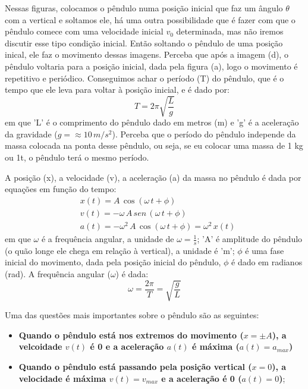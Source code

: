 \documentclass[12pt]{extarticle}
\newcommand{\<}{\langle}
\renewcommand{\>}{\rangle}
\theoremstyle{definition}
\begin{document}
Nessas figuras, colocamos o pêndulo numa posição inicial que faz um ângulo $\theta$ com a vertical e soltamos ele, há uma outra possibilidade que é fazer com que o pêndulo comece com uma velocidade inicial $v_0$ determinada, mas não iremos discutir esse tipo condição inicial. Então soltando o pêndulo de uma posição inical, ele faz o movimento dessas imagens. Perceba que após a imagem (d), o pêndulo voltaria para a posição inicial, dada pela figura (a), logo o movimento é repetitivo e periódico. Conseguimos achar o período (T) do pêndulo, que é o tempo que ele leva para voltar à posição inicial, e é dado por:
\begin{equation}
    T = 2\pi \sqrt{\frac{L}{g}}
\end{equation}
\noindent em que 'L' é o comprimento do pêndulo dado em metros (m) e 'g' é a aceleração da gravidade ($g=\approx 10\,m/s^2$). Perceba que o período do pêndulo independe da massa colocada na ponta desse pêndulo, ou seja, se eu colocar uma massa de 1 kg ou 1t, o pêndulo terá o mesmo período.

A posição (x), a velocidade (v), a aceleração (a) da massa no pêndulo é dada por equações em função do tempo:
\begin{align}
    &x(t) = A\,\cos(\omega\,t + \phi) \label{eq:pos}\\
    &v(t) = -\omega\,A\,sen\,(\omega\, t + \phi)\label{eq:vel}\\\
    &a(t) = -\omega^2\,A\,\cos(\omega\,t + \phi) = \omega^2\,x(t) \label{eq:acel}\
\end{align}
\noindent em que $\omega$ é a frequência angular, a unidade de $\omega = \frac{1}{s}$; 'A' é amplitude do pêndulo (o quão longe ele chega em relação à vertical), a unidade é 'm'; $\phi$ é uma fase inicial do movimento, dada pela posição inicial do pêndulo, $\phi$ é dado em radianos (rad). A frequência angular ($\omega$) é dada:
\begin{equation}
    \omega = \frac{2\pi}{T} = \sqrt{\frac{g}{L}}
\end{equation}

Uma das questões mais importantes sobre o pêndulo são as seguintes:
\begin{itemize}
    \item \textbf{Quando o pêndulo está nos extremos do movimento ($x= \pm A$), a velcoidade $v(t)$ é 0 e a aceleração $a(t)$ é máxima ($a(t) = a_{max}$)}
    \item \textbf{Quando o pêndulo está passando pela posição vertical ($x=0$), a velocidade é máxima $v(t) = v_{max}$ e a aceleração é 0 ($a(t) =0$)};
\end{itemize}
\end{document}
